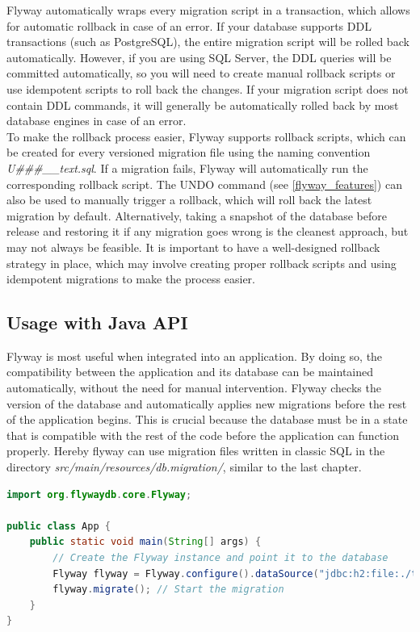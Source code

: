 %
Flyway automatically wraps every migration script in a transaction, which allows for automatic rollback in case of an error. If your database supports DDL transactions (such as PostgreSQL), the entire migration script will be rolled back automatically. However, if you are using SQL Server, the DDL queries will be committed automatically, so you will need to create manual rollback scripts or use idempotent scripts to roll back the changes. If your migration script does not contain DDL commands, it will generally be automatically rolled back by most database engines in case of an error.\\
To make the rollback process easier, Flyway supports rollback scripts, which can be created for every versioned migration file using the naming convention \textit{U\#\#\#\_\_text.sql}. If a migration fails, Flyway will automatically run the corresponding rollback script. The UNDO command (see \autoref{flyway_features}) can also be used to manually trigger a rollback, which will roll back the latest migration by default. Alternatively, taking a snapshot of the database before release and restoring it if any migration goes wrong is the cleanest approach, but may not always be feasible. It is important to have a well-designed rollback strategy in place, which may involve creating proper rollback scripts and using idempotent migrations to make the process easier.

\newpage
\subsection{Usage with Java API}
%
Flyway is most useful when integrated into an application. By doing so, the compatibility between the application and its database can be maintained automatically, without the need for manual intervention. Flyway checks the version of the database and automatically applies new migrations before the rest of the application begins. This is crucial because the database must be in a state that is compatible with the rest of the code before the application can function properly. Hereby flyway can use migration files written in classic SQL in the directory \textit{src/main/resources/db.migration/}, similar to the last chapter.

\begin{lstlisting}[language=Java]
import org.flywaydb.core.Flyway;

public class App {
	public static void main(String[] args) {
		// Create the Flyway instance and point it to the database
		Flyway flyway = Flyway.configure().dataSource("jdbc:h2:file:./target/foobar", "sa", null).load();
		flyway.migrate(); // Start the migration
	}
}
\end{lstlisting}

